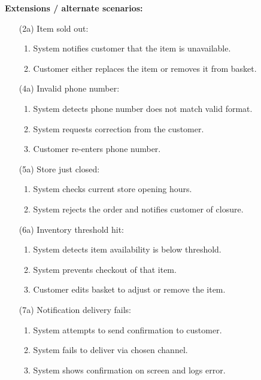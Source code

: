 \documentclass{article}
\begin{document}
\textbf{Extensions / alternate scenarios:}
\begin{itemize}
    \item[(2a)] Item sold out:
    \begin{enumerate}
        \item System notifies customer that the item is unavailable.
        \item Customer either replaces the item or removes it from basket.
    \end{enumerate}

    \item[(4a)] Invalid phone number:
    \begin{enumerate}
        \item System detects phone number does not match valid format.
        \item System requests correction from the customer.
        \item Customer re-enters phone number.
    \end{enumerate}

    \item[(5a)] Store just closed:
    \begin{enumerate}
        \item System checks current store opening hours.
        \item System rejects the order and notifies customer of closure.
    \end{enumerate}

    \item[(6a)] Inventory threshold hit:
    \begin{enumerate}
        \item System detects item availability is below threshold.
        \item System prevents checkout of that item.
        \item Customer edits basket to adjust or remove the item.
    \end{enumerate}

    \item[(7a)] Notification delivery fails:
    \begin{enumerate}
        \item System attempts to send confirmation to customer.
        \item System fails to deliver via chosen channel.
        \item System shows confirmation on screen and logs error.
    \end{enumerate}
\end{itemize}
\end{document}
